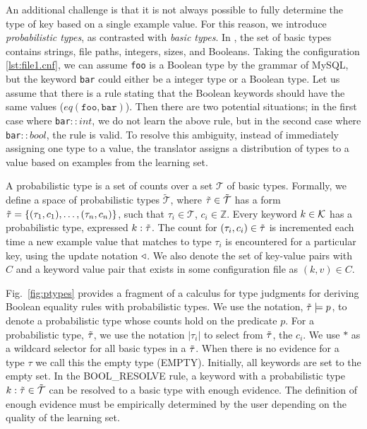 An additional challenge is that it is not always possible to fully determine the type of key based on a single example value. 
For this reason, we introduce \textit{probabilistic types}, as contrasted with \textit{basic types}.
In \app, the set of basic types contains strings, file paths, integers, sizes, and Booleans. 
Taking the configuration \ref{lst:file1.cnf}, we can assume {\tt foo} is a Boolean type by the grammar of MySQL,
  but the keyword {\tt bar} could either be a integer type or a Boolean type.
Let us assume that there is a rule stating that the Boolean keywords should have the same values ($eq(\texttt{foo},\texttt{bar})$).
Then there are two potential situations; in the first case where {\tt bar}$::int$, we do not learn the above rule, but in the second case where {\tt bar}$::bool$, the rule is valid.
To resolve this ambiguity, instead of immediately assigning one type to a value, the translator assigns a distribution of types to a value based on examples from the learning set.


A probabilistic type is a set of counts over a set $\mathcal{T}$ of basic types.
Formally, we define a space of probabilistic types $\tilde{\mathcal{T}}$, where $\tilde{\tau} \in \tilde{\mathcal{T}}$ has a form $\tilde{\tau}=\{(\tau_1, c_1),\ldots,(\tau_n, c_n)\}$, such that $\tau_i \in \mathcal{T}$, $c_i \in \mathbb{Z}$. 
Every keyword $k\in\mathcal{K}$ has a probabilistic type, expressed $k:\tilde{\tau}$.
The count for $(\tau_i,c_i) \in \tilde{\tau}$ is incremented each time a new example value that matches to type $\tau_i$ is encountered for a particular key, using the update notation $\triangleleft$.
We also denote the set of key-value pairs with $C$ and a keyword value pair that exists in some configuration file as $(k,v) \in C$.

Fig.~\ref{fig:ptypes} provides a fragment of a calculus for type judgments for deriving Boolean equality rules with probabilistic types.
We use the notation, $\tilde{\tau} \models p$, to denote a probabilistic type whose counts hold on the predicate $p$. 
For a probabilistic type, $\tilde{\tau}$, we use the notation $|\tau_i|$ to select from $\tilde{\tau}$, the $c_i$.
We use $*$ as a wildcard selector for all basic types in a $\tilde{\tau}$.
When there is no evidence for a type $\tau$ we call this the empty type ({\scriptsize EMPTY}). 
Initially, all keywords are set to the empty set.
In the {\scriptsize BOOL\_RESOLVE} rule, a keyword with a probabilistic type $k : \tilde{\tau} \in \tilde{\mathcal{T}}$ can be resolved to a basic type with enough evidence.
The definition of enough evidence must be empirically determined by the user depending on the quality of the learning set.

